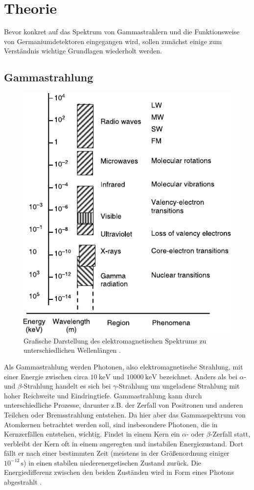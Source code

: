 \section{Theorie}
\label{sec:Theorie}

Bevor konkret auf das Spektrum von Gammastrahlern und die Funktionsweise von Germaniumdetektoren eingegangen wird, sollen zunächst einige zum
Verständnis wichtige Grundlagen wiederholt werden.

\subsection{Gammastrahlung}

\begin{figure}
    \centering
    \includegraphics{figures/light_energies.pdf}
    \caption{Grafische Darstellung des elektromagnetischen Spektrums zu unterschiedlichen Wellenlängen \cite{gamma}.}
    \label{fig:ems}
\end{figure}

Als Gammastrahlung werden Photonen, also elektromagnetische Strahlung, mit einer Energie zwischen circa $\SI{10}{\kilo\eV}$ und $\SI{10000}{\kilo\eV}$ bezeichnet.
Anders als bei $\alpha$- und $\beta$-Strahlung handelt es sich bei $\gamma$-Strahlung um ungeladene Strahlung mit hoher Reichweite und Eindringtiefe.
Gammastrahlung kann durch unterschiedliche Prozesse, darunter z.B. der Zerfall von Positronen und anderen Teilchen oder Bremsstrahlung entstehen.
Da hier aber das Gammaspektrum von Atomkernen betrachtet werden soll, sind insbesondere Photonen, die in Kernzerfällen entstehen, wichtig.
Findet in einem Kern ein $\alpha$- oder $\beta$-Zerfall statt, verbleibt der Kern oft in einem angeregten und instabilen Energiezustand.
Dort fällt er nach einer bestimmten Zeit (meistens in der Größenordnung einiger $10^{-12}\, \si{\second}$) in einen stabilen niederenergetischen Zustand zurück.
Die Energiedifferenz zwischen den beiden Zuständen wird in Form eines Photons abgestrahlt \cite{gamma}. \\

